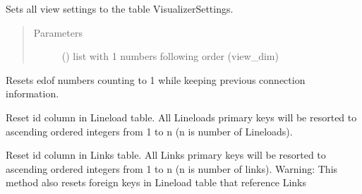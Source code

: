 \documentclass[letterpaper,10pt,english]{sphinxmanual}
\begin{document}
\begin{fulllineitems}
\begin{fulllineitems}
\label{\detokenize{api:beamon.database.Database.set_view_settings}}
Sets all view settings to the table VisualizerSettings.
\begin{quote}\begin{description}
\item[{Parameters}] \leavevmode
{} () \textendash{} list with 1 numbers following order (view\_dim)

\end{description}\end{quote}

\end{fulllineitems}


\begin{fulllineitems}
\label{\detokenize{api:beamon.database.Database.sort_edof}}
Resets edof numbers counting to 1 while keeping previous connection information.

\end{fulllineitems}


\begin{fulllineitems}
\label{\detokenize{api:beamon.database.Database.sort_lineload_indexes}}
Reset id column in Lineload table.
All Lineloads primary keys will be resorted to ascending ordered integers from 1 to n (n is number of Lineloads).

\end{fulllineitems}


\begin{fulllineitems}
\label{\detokenize{api:beamon.database.Database.sort_link_indexes}}
Reset id column in Links table.
All Links primary keys will be resorted to ascending ordered integers from 1 to n (n is number of links).
Warning: This method also resets foreign keys in Lineload table that reference Links


\end{fulllineitems}
\end{fulllineitems}
\end{document}

